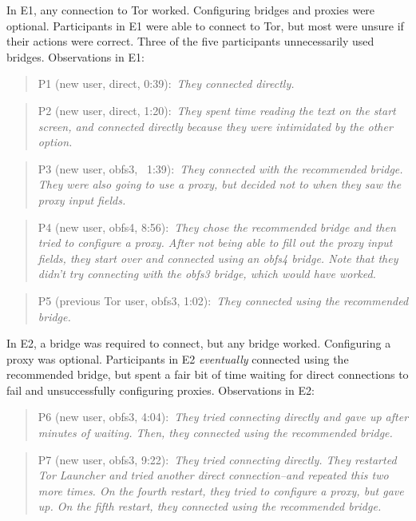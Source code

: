 \documentclass[USenglish,oneside,twocolumn]{article}
\newcommand{\pquote}[2]{
\begin{quotation}
\noindent #1:~\textit{#2}
\end{quotation}
}
\begin{document}


In E1, any connection to Tor worked. Configuring bridges and proxies were optional.  
Participants in E1 were able to connect to Tor, but most were unsure if their actions were correct. Three of the five participants unnecessarily used bridges. 
Observations in E1: 

\pquote{P1 (new user, direct, 0:39)}{They connected directly.}

\pquote{P2 (new user, direct, 1:20)}{They spent time reading the text on the start screen, and connected directly because they were intimidated by the other option.}

\pquote{P3 (new user, obfs3, ~1:39)}{They connected with the recommended bridge. They were also going to use a proxy, but decided not to when they saw the proxy input fields.}

\pquote{P4 (new user, obfs4, 8:56)}{They chose the recommended bridge and then tried to configure a proxy. After not being able to fill out the proxy input fields, they start over and connected using an obfs4 bridge. Note that they didn't try connecting with the obfs3 bridge, which would have worked.}

\pquote{P5 (previous Tor user, obfs3, 1:02)}{They connected using the recommended bridge.}

In E2, a bridge was required to connect, but any bridge worked. Configuring a proxy was optional.
Participants in E2 {\it eventually} connected using the recommended bridge, but spent a fair bit of time waiting for direct connections to fail and unsuccessfully configuring proxies. 
Observations in E2: 

\pquote{P6 (new user, obfs3, 4:04)}{They tried connecting directly and gave up after minutes of waiting. Then, they connected using the recommended bridge.}

\pquote{P7 (new user, obfs3, 9:22)}{They tried connecting directly. They restarted Tor Launcher and tried another direct connection--and repeated this two more times. On the fourth restart, they tried to configure a proxy, but gave up. On the fifth restart, they connected using the recommended bridge.}
\end{document}
